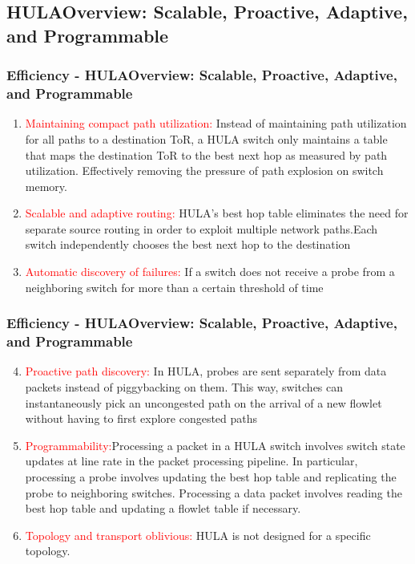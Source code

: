 \documentclass{beamer}
\begin{document}

\subsection{HULAOverview: Scalable, Proactive, Adaptive, and Programmable}
\begin{frame}
	\frametitle{Efficiency - HULAOverview: Scalable, Proactive, Adaptive, and Programmable}
	\begin{enumerate}
		\item\textcolor{red}{Maintaining compact path utilization:}  Instead of maintaining path utilization for all paths to a destination ToR, a HULA switch only maintains a table that maps the destination ToR to the best next hop as measured by path utilization. Effectively removing the pressure of path explosion on switch memory.
		\item\textcolor{red}{Scalable and adaptive routing:}  HULA’s best hop table eliminates the need for separate source routing in order to exploit multiple network paths.Each switch independently chooses the best next hop to the destination
		\item\textcolor{red}{Automatic discovery of failures:} If a switch does not receive a probe from a neighboring switch for more than a certain threshold of time
	\end{enumerate}
\end{frame}


\begin{frame}
	\frametitle{Efficiency - HULAOverview: Scalable, Proactive, Adaptive, and Programmable}
	\begin{enumerate}
		\setcounter{enumi}{3}
		\item\textcolor{red}{Proactive path discovery:}  In HULA, probes are sent separately from data packets instead of piggybacking on them.  This way, switches can instantaneously pick an uncongested path on the arrival of a new flowlet without having to first explore congested paths
		\item\textcolor{red}{Programmability:}Processing a packet in a HULA switch involves switch state updates at line rate in the packet processing pipeline. In particular, processing a probe involves updating the best hop table and replicating the probe to neighboring switches. Processing a data packet involves reading the best hop table and updating a flowlet table if necessary.
		\item\textcolor{red}{Topology and transport oblivious:} HULA is not designed for a specific topology.
	\end{enumerate}
\end{frame}
\end{document}
